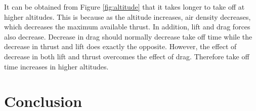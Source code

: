 \documentclass[letterpaper,12pt]{article}
\begin{document}
It can be obtained from Figure \ref{fig:altitude} that it takes longer to take off at higher altitudes. 
This is because as the altitude increases, air density decreases, which decreases the maximum available
thrust. In addition, lift and drag forces also decrease. Decrease in drag should normally decrease 
take off time while the decrease in thrust and lift does exactly the opposite. However, 
the effect of decrease in both lift and thrust overcomes the effect of drag. Therefore 
take off time increases in higher altitudes.


\section{Conclusion}
\end{document}
